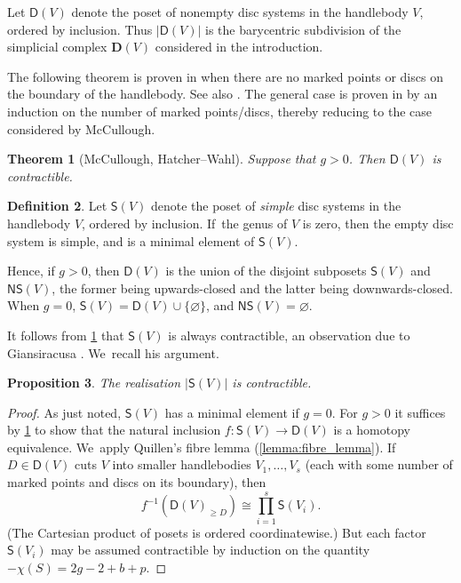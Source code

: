 \documentclass[11pt]{article}
\theoremstyle{plain}
\newtheorem{thm}{Theorem}[section]
\newtheorem{prop}[thm]{Proposition}
\theoremstyle{definition}
\newtheorem{defn}[thm]{Definition}
\newcommand{\NS}{\mathsf{NS}}
\newcommand{\D}{\mathsf{D}}
\newcommand{\SD}{\mathsf{S}}
\begin{document}
Let $\D(V)$ denote the poset of nonempty disc systems in the handlebody $V$, ordered by inclusion. Thus $|\D(V)|$ is the barycentric subdivision of the simplicial complex $ \mathbf D(V)$ considered in the introduction.

The following theorem is proven in \cite[Th.\,5.3]{mccullough} when there are no marked points or discs on the boundary of the handlebody. See also \cite{cho}. The general case is proven in \cite[Prop.\,8.1]{hatcherwahl} by an induction on the number of marked points/discs, thereby reducing to the case considered by McCullough.

\begin{thm}[McCullough, Hatcher--Wahl]\label{disk cx contractible}
Suppose that $g>0$. Then $\D(V)$ is contractible.
\end{thm}

\begin{defn}Let
$\SD(V)$ denote the poset of \emph{simple} disc systems in the handlebody $V$, ordered by inclusion. If~the genus of $V$ is zero, then the empty disc system is simple, and is a minimal element of $\SD(V)$.
\end{defn}

Hence, if $g>0$, then $\mathsf D(V)$ is the union of the disjoint subposets $\SD(V)$ and $\NS(V)$, the former being upwards-closed and the latter being downwards-closed. When $g=0$, $\mathsf S(V)=\mathsf D(V) \cup \{\varnothing\}$, and $\NS(V)=\varnothing$.

It follows from \cref{disk cx contractible} that $\SD(V)$ is always contractible, an observation due to Giansiracusa \cite[Prop.\,6.3]{giansiracusa}. We~recall his argument.

\begin{prop}\label{prop: S contractible}
The realisation $|\SD(V)|$ is contractible.
\end{prop}

\begin{proof}
As just noted, $\SD(V)$ has a minimal element if $g=0$. For $g>0$ it suffices by \cref{disk cx contractible} to show that the natural inclusion $f:\SD(V)\to\D(V)$ is a homotopy equivalence. We~apply Quillen's fibre lemma (\ref{lemma:fibre_lemma}). If~$D \in \D(V)$ cuts $V$ into smaller handlebodies $V_1,\dots,V_s$ (each with some number of marked points and discs on its boundary), then
\[
f^{-1}(\D(V)_{\geq D}) \cong \prod_{i=1}^s \SD(V_i).
\](The Cartesian product of posets is ordered coordinatewise.)
But each factor $\SD(V_i)$ may be assumed contractible by induction on the quantity $-\chi(S) = 2g-2+b+p$.
\end{proof}
\end{document}
